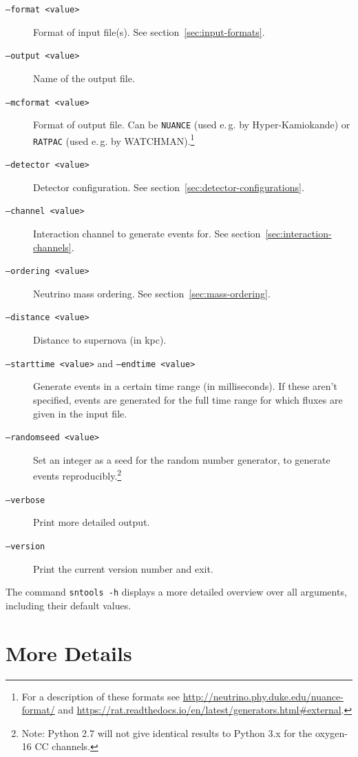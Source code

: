 \documentclass[11pt, oneside]{article}
\begin{document}
\begin{description}
\item[\texttt{--format <value>}] Format of input file(s). See section~\ref{sec:input-formats}.
\item[\texttt{--output <value>}] Name of the output file.
\item[\texttt{--mcformat <value>}] Format of output file. Can be \texttt{NUANCE} (used e.\,g. by Hyper-Kamiokande) or \texttt{RATPAC} (used e.\,g. by WATCHMAN).\footnote{For a description of these formats see \url{http://neutrino.phy.duke.edu/nuance-format/} and \url{https://rat.readthedocs.io/en/latest/generators.html\#external}.}

\item[\texttt{--detector <value>}] Detector configuration. See section~\ref{sec:detector-configurations}.
\item[\texttt{--channel <value>}] Interaction channel to generate events for. See section~\ref{sec:interaction-channels}.
\item[\texttt{--ordering <value>}] Neutrino mass ordering. See section~\ref{sec:mass-ordering}.
\item[\texttt{--distance <value>}] Distance to supernova (in kpc).
\item[\texttt{--starttime <value>} and \texttt{--endtime <value>}] Generate events in a certain time range (in milliseconds). If these aren’t specified, events are generated for the full time range for which fluxes are given in the input file.
\item[\texttt{--randomseed <value>}] Set an integer as a seed for the random number generator, to generate events reproducibly.\footnote{Note: Python 2.7 will not give identical results to Python 3.x for the oxygen-16 CC channels.}
\item[\texttt{--verbose}] Print more detailed output.
\item[\texttt{--version}] Print the current version number and exit.
\end{description}

The command \texttt{sntools -h} displays a more detailed overview over all arguments, including their default values.



\section{More Details}
\end{document}
